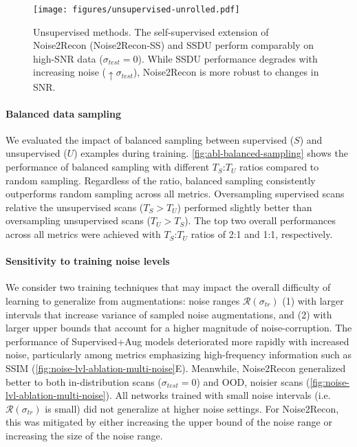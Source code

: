 \documentclass[10pt,twocolumn,letterpaper]{article}
\newcommand{\noiserange}{\mathcal{R}(\sigma_{tr})}
\newcommand{\testnoise}{\sigma_{test}}
\newcommand{\RV}[1]{{#1}}
\begin{document}
\begin{figure}[t!]
    \centering
    \begin{center}
    \texttt{[image: figures/unsupervised-unrolled.pdf]}
    \end{center}
    \caption{\RV{Unsupervised methods. The self-supervised extension of Noise2Recon (Noise2Recon-SS) and SSDU perform comparably on high-SNR data ($\sigma_{test}=0$). While SSDU performance degrades with increasing noise ($\uparrow \sigma_{test}$), Noise2Recon is more robust to changes in SNR.}}
    \label{fig:unsupervised}
\end{figure}


\paragraph{Balanced data sampling} We evaluated the impact of balanced sampling between supervised ($S$) and unsupervised ($U$) examples during training. \cref{fig:abl-balanced-sampling} shows the performance of balanced sampling with different $T_S$:$T_U$ ratios compared to random sampling. Regardless of the ratio, balanced sampling consistently outperforms random sampling across all metrics. Oversampling supervised scans relative the unsupervised scans ($T_S>T_U$) performed slightly better than oversampling unsupervised scans ($T_U>T_S$). The top two overall performances across all metrics were achieved with $T_S$:$T_U$ ratios of 2:1 and 1:1, respectively.

\paragraph{Sensitivity to training noise levels} We consider two training techniques that may impact the overall difficulty of learning to generalize from augmentations: noise ranges $\noiserange$ (1) with larger intervals that increase variance of sampled noise augmentations, and (2) with larger upper bounds that account for a higher magnitude of noise-corruption. The performance of Supervised+Aug models deteriorated more rapidly with increased noise, particularly among metrics emphasizing high-frequency information such as SSIM (\cref{fig:noise-lvl-ablation-multi-noise}E). Meanwhile, Noise2Recon generalized better to both in-distribution scans ($\testnoise=0$) and OOD, noisier scans (\cref{fig:noise-lvl-ablation-multi-noise}). All networks trained with small noise intervals (i.e. $\noiserange$ is small) did not generalize at higher noise settings. For Noise2Recon, this was mitigated by either increasing the upper bound of the noise range or increasing the size of the noise range.
\end{document}
